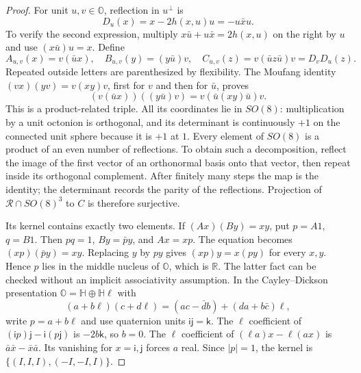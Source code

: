 \documentclass[11pt]{article}
\theoremstyle{definition}
\begin{document}
\begin{proof}
For unit $u,v\in\mathbb O$, reflection in $u^\perp$ is
\[
 D_u(x)=x-2h(x,u)u=-u\bar x u.
\]
To verify the second expression, multiply
$x\bar u+u\bar x=2h(x,u)$ on the right by $u$ and use
$(x\bar u)u=x$. Define
\[
 A_{u,v}(x)=v(\bar u x),\quad
 B_{u,v}(y)=(y\bar u)v,\quad
 C_{u,v}(z)=v(\bar u z\bar u)v=D_vD_u(z).
\]
Repeated outside letters are parenthesized by flexibility. The
Moufang identity $(vx)(yv)=v(xy)v$, first for $v$ and then for $\bar u$,
proves
\[
 (v(\bar u x))((y\bar u)v)=v(\bar u(xy)\bar u)v.
\]
This is a product-related triple. All its coordinates lie in $SO(8)$:
multiplication by a unit octonion is orthogonal, and its determinant
is continuously $+1$ on the connected unit sphere because it is $+1$
at $1$. Every element of $SO(8)$ is a product of an even number of
reflections. To obtain such a decomposition, reflect the image of the
first vector of an orthonormal basis onto that vector, then repeat
inside its orthogonal complement. After finitely many steps the map is
the identity; the determinant records the parity of the reflections.
Projection of $\mathcal R\cap SO(8)^3$ to $C$ is therefore surjective.

Its kernel contains exactly two elements. If $(Ax)(By)=xy$, put
$p=A1$, $q=B1$. Then $pq=1$, $By=\bar p y$, and $Ax=xp$.
The equation becomes $(xp)(\bar p y)=xy$. Replacing $y$ by $py$
gives $(xp)y=x(py)$ for every $x,y$. Hence $p$ lies in the middle
nucleus of $\mathbb O$, which is $\mathbb R$. The latter fact can be
checked without an implicit associativity assumption. In the
Cayley--Dickson presentation $\mathbb O=\mathbb H\oplus\mathbb H\ell$
with
\[
 (a+b\ell)(c+d\ell)=(ac-\bar d b)+(da+b\bar c)\ell,
\]
write $p=a+b\ell$ and use quaternion units
$\mathsf i\mathsf j=\mathsf k$. The $\ell$ coefficient of
$(\mathsf i p)\mathsf j-\mathsf i(p\mathsf j)$ is $-2b\mathsf k$,
so $b=0$. The $\ell$ coefficient of
$(\ell a)x-\ell(ax)$ is $\bar a\bar x-\bar x\bar a$.
Its vanishing for $x=\mathsf i,\mathsf j$ forces $a$ real.
Since $|p|=1$, the kernel is
$\{(I,I,I),(-I,-I,I)\}$.


\end{proof}
\end{document}
